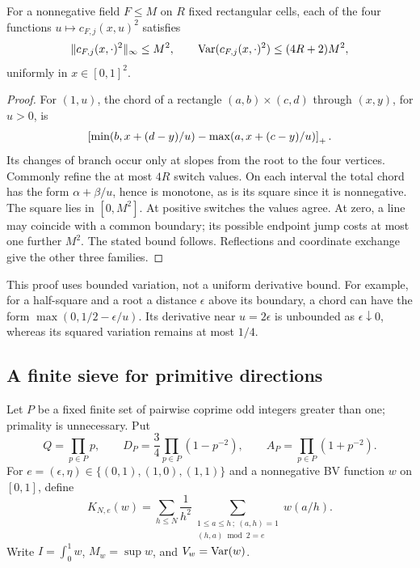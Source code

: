 \begin{lemma}\label{lem:bv}
For a nonnegative field \(F\le M\) on \(R\) fixed rectangular cells,
each of the four functions \(u\mapsto c_{F,j}(x,u)^2\) satisfies
\[
 \|c_{F,j}(x,\cdot)^2\|_\infty\le M^2,
 \qquad \operatorname{Var}(c_{F,j}(x,\cdot)^2)\le(4R+2)M^2,
\]
uniformly in \(x\in[0,1]^2\).
\end{lemma}
\begin{proof}
For \((1,u)\), the chord of a rectangle \((a,b)\times(c,d)\) through
\((x,y)\), for \(u>0\), is
\[
 \left[\min(b,x+(d-y)/u)-\max(a,x+(c-y)/u)\right]_+.
\]
Its changes of branch occur only at slopes from the root to the four
vertices. Commonly refine the at most \(4R\) switch values. On each
interval the total chord has the form \(\alpha+\beta/u\), hence is
monotone, as is its square since it is nonnegative. The square lies
in \([0,M^2]\). At positive switches the values agree. At zero, a line
may coincide with a common boundary; its possible endpoint jump costs
at most one further \(M^2\). The stated bound follows. Reflections
and coordinate exchange give the other three families.
\end{proof}

This proof uses bounded variation, not a uniform derivative bound.
For example, for a half-square and a root a distance \(\epsilon\)
above its boundary, a chord can have the form
\(\max(0,1/2-\epsilon/u)\). Its derivative near \(u=2\epsilon\)
is unbounded as \(\epsilon\downarrow0\), whereas its squared
variation remains at most \(1/4\).

\subsection{A finite sieve for primitive directions}\label{sec:sieve}
Let \(P\) be a fixed finite set of pairwise coprime odd integers greater
than one; primality is unnecessary. Put
\[
 Q=\prod_{p\in P}p,\qquad
 D_P=\frac34\prod_{p\in P}(1-p^{-2}),\qquad
 A_P=\prod_{p\in P}(1+p^{-2}).
\]
For \(e=(\epsilon,\eta)\in\{(0,1),(1,0),(1,1)\}\) and a nonnegative
BV function \(w\) on \([0,1]\), define
\[
 K_{N,e}(w)=\sum_{h\le N}\frac1{h^2}
 \sum_{\substack{1\le a\le h\,;\ (a,h)=1\\(h,a)\bmod2=e}}w(a/h).
\]
Write \(I=\int_0^1w\), \(M_w=\sup w\), and \(V_w=\operatorname{Var}(w)\).

